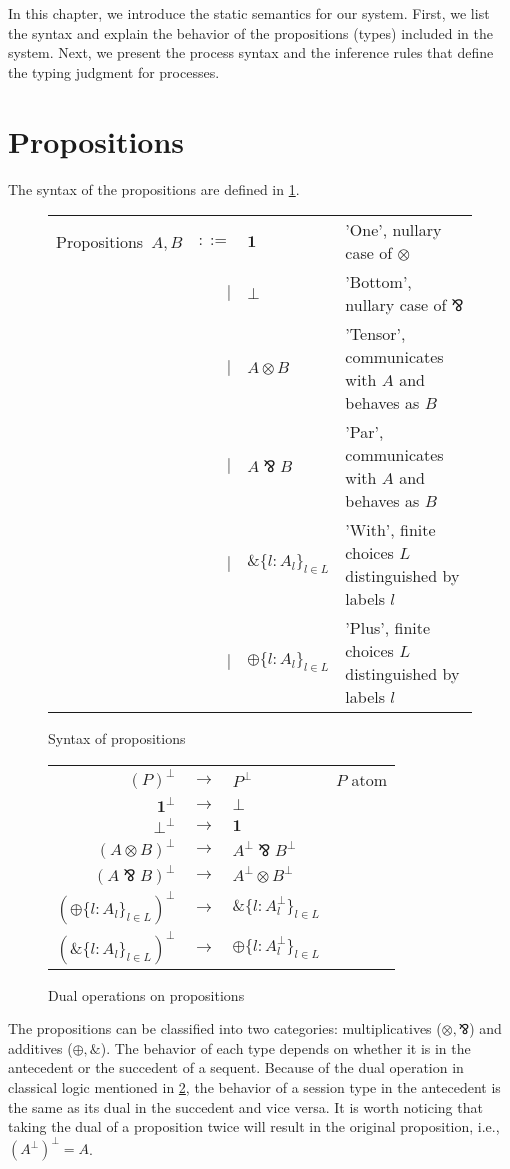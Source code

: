 \documentclass[12pt, openany]{memoir}
\newcommand*{\pare}[0]{\mathbin{\bindnasrepma}}
\begin{document}
In this chapter, we introduce the static semantics for our system. 
First, we list the syntax and explain the behavior of the propositions (types) included in the system.
Next, we present the process syntax and the inference rules that define the typing judgment for processes.
\section{Propositions} \label{sec:propsyntax}
The syntax of the propositions are defined in \cref{fig:propositions}.
\begin{figure}[H]
  \centering
  \begin{tabular}{c r l l}
    Propositions\ $A, B$ & $::=$ & $\textbf{1}$ & 'One', nullary case of $\otimes$ \\ 
    & $\mid$ & $\boldsymbol{\bot}$ & 'Bottom', nullary case of $\pare$  \\
    & $\mid$ & $A \otimes B$ & 'Tensor', communicates with $A$ and behaves as $B$  \\  
    & $\mid$ & $A \pare B$ & 'Par', communicates with $A$ and behaves as $B$ \\    
    & $\mid$ & $\& \{l : A_l\}_{l \in L}$ & 'With', finite choices $L$ distinguished by labels $l$ \\
    & $\mid$ & $\oplus \{l : A_l\}_{l \in L}$ & 'Plus', finite choices $L$ distinguished by labels $l$ 
   \end{tabular}
  \caption{Syntax of propositions}
  \label{fig:propositions}
\end{figure}
\begin{figure}[H]
  \centering
  \begin{tabular}{r c l l}
    $(P)^\bot$ & $\longrightarrow$ & $P^\bot$ & $P$ atom \\ 
    $\textbf{1}^\bot$ & $\longrightarrow$ & $\boldsymbol{\bot}$ & \\
    $\boldsymbol{\bot} ^ \bot$ & $\longrightarrow$ & $\textbf{1}$ & \\
    $(A \otimes B)^\bot$ & $\longrightarrow$ & $A^\bot\pare B^\bot$ &  \\  
    $(A \pare B)^\bot$ & $\longrightarrow$ & $A^\bot \otimes B^\bot$ & \\    
    $(\oplus\{l : A_l\}_{l \in L})^\bot$ & $\longrightarrow$ & $\& \{l : A_l^\bot\}_{l \in L}$ & \\ 
    $(\&\{l : A_l\}_{l \in L})^\bot$ & $\longrightarrow$ & $\oplus \{l : A_l^\bot\}_{l \in L}$ & \\
   \end{tabular}
  \caption{Dual operations on propositions}
  \label{fig:dual}
\end{figure}
The propositions can be classified into two categories: multiplicatives ($\otimes, \pare$) and additives ($\oplus, \&$). 
The behavior of each type depends on whether it is in the antecedent or the succedent of a sequent. 
Because of the dual operation in classical logic mentioned in \cref{fig:dual}, 
the behavior of a session type in the antecedent is the same as its dual in the succedent and vice versa. 
It is worth noticing that taking the dual of a proposition twice will result in the original proposition, i.e., ${(A^\bot)}^\bot = A$.
\end{document}

